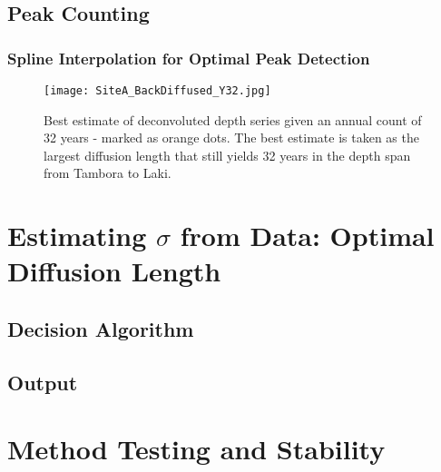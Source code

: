 \documentclass[../../CompleteThesis/Complete_1stDraft.tex]{subfiles}
\begin{document}
	
	
	
	
	
	\subsection[Peak Counting]{Peak Counting}
	\label{Subsec:Method_FirstSigmaEstimate_PeakCounting}
	
	\subsubsection[Interpolation]{Spline Interpolation for Optimal Peak Detection}
	\label{Subsubsec:Method_FirstSigmaEstimate_PeakCounting_SplineInterp}
	
	\begin{figure}
		\centering
		\texttt{[image: SiteA\_BackDiffused\_Y32.jpg]}
		\caption[Best estimate of deconvoluted depth series, Site A]{Best estimate of deconvoluted depth series given an annual count of 32 years - marked as orange dots. The best estimate is taken as the largest diffusion length that still yields 32 years in the depth span from Tambora to Laki.}
		\label{fig:SiteA_BackDiffused_Y32}
	\end{figure}
	
	\section[Optimal $\sigma$ Estimate]{Estimating $\sigma$ from Data: Optimal Diffusion Length}
	\label{Sec:Method_OptimalSigmaEstimate}
	
	\subsection[Decision algorithm]{Decision Algorithm}
	\label{Subsec:Method_OptimalSigmaEstimate_DecisionAlgorithm}
	
	\subsection[Output]{Output}
	\label{Subsec:Method_OptimalSigmaEstimate_Output}
	
	
	
	\section[Stability Tests]{Method Testing and Stability}
	\label{Sec:Method_StabilityTests}
	
\end{document}
